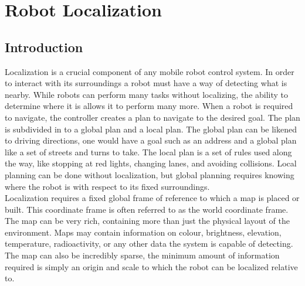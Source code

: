 \chapter{Robot Localization}
\label{chap:localiz}


\section{Introduction}
Localization is a crucial component of any mobile robot control system. In order to interact with its surroundings a robot must have a way of detecting what is nearby. While robots can perform many tasks without localizing, the ability to determine where it is allows it to perform many more. When a robot is required to navigate, the controller creates a plan to navigate to the desired goal. The plan is subdivided in to a global plan and a local plan. The global plan can be likened to driving directions, one would have a goal such as an address and a global plan like a set of streets and turns to take. The local plan is a set of rules used along the way, like stopping at red lights, changing lanes, and avoiding collisions. Local planning can be done without localization, but global planning requires knowing where the robot is with respect to its fixed surroundings.\\

Localization requires a fixed global frame of reference to which a map is placed or built. This coordinate frame is often referred to as the world coordinate frame. The map can be very rich, containing more than just the physical layout of the environment. Maps may contain information on colour, brightness, elevation, temperature, radioactivity, or any other data the system is capable of detecting. The map can also be incredibly sparse, the minimum amount of information required is simply an origin and scale to which the robot can be localized relative to.\\

